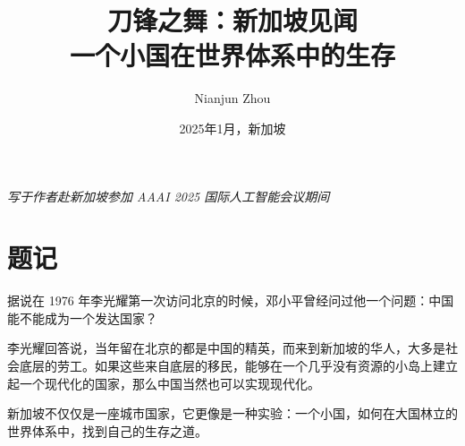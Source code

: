 \documentclass[12pt, a4paper]{book}
\title{
    {\Huge\textbf{刀锋之舞：新加坡见闻}}\\[0.5em]
    {\large 一个小国在世界体系中的生存}
}
\author{Nianjun Zhou}
\date{2025年1月，新加坡}
\begin{document}
\frontmatter
\maketitle

\vspace{2em}
\begin{center}
\textit{写于作者赴新加坡参加 AAAI 2025 国际人工智能会议期间}
\end{center}

\chapter*{题记}

据说在 1976 年李光耀第一次访问北京的时候，邓小平曾经问过他一个问题：中国能不能成为一个发达国家？

李光耀回答说，当年留在北京的都是中国的精英，而来到新加坡的华人，大多是社会底层的劳工。如果这些来自底层的移民，能够在一个几乎没有资源的小岛上建立起一个现代化的国家，那么中国当然也可以实现现代化。

新加坡不仅仅是一座城市国家，它更像是一种实验：一个小国，如何在大国林立的世界体系中，找到自己的生存之道。

\tableofcontents

\mainmatter






\end{document}
